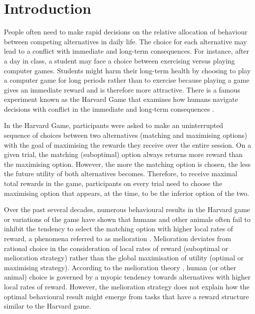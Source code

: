 \documentclass[twocolumn]{article}
\begin{document}
\saythanks

\setlength{\baselineskip}{12pt plus.2pt}

\section{Introduction}

People often need to make rapid decisions on the relative allocation
of behaviour between competing alternatives in daily life. The choice
for each alternative may lead to a conflict with immediate and
long-term consequences. For instance, after a day in class, a student
may face a choice between exercising versus playing computer
games. Students might harm their long-term health by choosing to play
a computer game for long periods rather than to exercise because
playing a game gives an immediate reward and is therefore more
attractive. There is a famous experiment known as the Harvard Game
that examines how humans navigate decisions with conflict in the
immediate and long-term consequences \cite{RN1}.

In the Harvard Game, participants were asked to make an uninterrupted
sequence of choices between two alternatives (matching and maximising
options) with the goal of maximising the rewards they receive over the
entire session. On a given trial, the matching (suboptimal) option
always returns more reward than the maximising option. However, the
more the matching option is chosen, the less the future utility of
both alternatives becomes. Therefore, to receive maximal total rewards
in the game, participants on every trial need to choose the maximising
option that appears, at the time, to be the inferior option of the
two.

Over the past several decades, numerous behavioural results in the
Harvard game or variations of the game \cite{RN4,RN3,RN5,RN20} have
shown that humans and other animals often fail to inhibit the tendency
to select the matching option with higher local rates of reward, a
phenomena referred to as melioration \cite{RN6,RN7}. Melioration
deviates from rational choice in the consideration of local rates of
reward (suboptimal or melioration strategy) rather than the global
maximisation of utility (optimal or maximising strategy). According to
the melioration theory \cite{RN6}, human (or other animal) choice is
governed by a myopic tendency towards alternatives with higher local
rates of reward. However, the melioration strategy does not explain
how the optimal behavioural result might emerge from tasks that have
a reward structure similar to the Harvard game.
\end{document}
